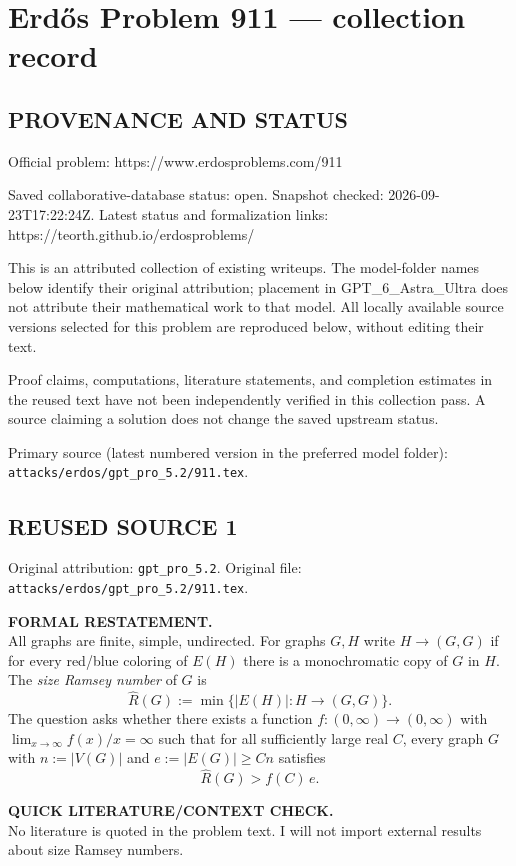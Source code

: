 \section*{Erd\H{o}s Problem 911 --- collection record}

\subsection*{PROVENANCE AND STATUS}
Official problem: https://www.erdosproblems.com/911

Saved collaborative-database status: open.
Snapshot checked: 2026-09-23T17:22:24Z.
Latest status and formalization links: https://teorth.github.io/erdosproblems/

This is an attributed collection of existing writeups. The model-folder names below identify their original attribution; placement in GPT\_6\_Astra\_Ultra does not attribute their mathematical work to that model. All locally available source versions selected for this problem are reproduced below, without editing their text.

Proof claims, computations, literature statements, and completion estimates in the reused text have not been independently verified in this collection pass. A source claiming a solution does not change the saved upstream status.

Primary source (latest numbered version in the preferred model folder): \texttt{attacks/erdos/gpt\_pro\_5.2/911.tex}.

\subsection*{REUSED SOURCE 1}
Original attribution: \texttt{gpt\_pro\_5.2}.
Original file: \texttt{attacks/erdos/gpt\_pro\_5.2/911.tex}.


\noindent\textbf{FORMAL RESTATEMENT.}\\
All graphs are finite, simple, undirected. For graphs $G,H$ write $H\to (G,G)$ if for every red/blue coloring of $E(H)$ there is a monochromatic copy of $G$ in $H$. The \emph{size Ramsey number} of $G$ is
\[
\hat R(G):=\min\{|E(H)|: H\to (G,G)\}.
\]
The question asks whether there exists a function $f:(0,\infty)\to (0,\infty)$ with $\lim_{x\to\infty} f(x)/x=\infty$ such that for all sufficiently large real $C$, every graph $G$ with $n:=|V(G)|$ and $e:=|E(G)|\ge Cn$ satisfies
\[
\hat R(G) > f(C)\, e.
\]

\medskip
\noindent\textbf{QUICK LITERATURE/CONTEXT CHECK.}\\
No literature is quoted in the problem text. I will not import external results about size Ramsey numbers.

